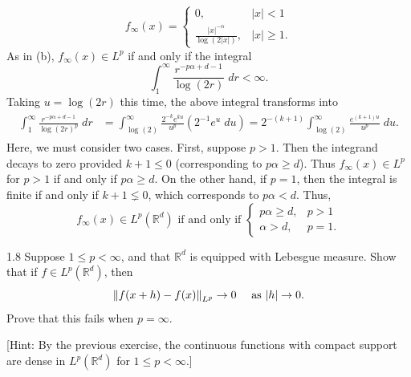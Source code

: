 \documentclass{article}
\begin{document}
\begin{enumerate}[itemsep =-2pt,label = (\alph{*})]
	\begin{equation*}
		f_{\infty}(x) = 
		\begin{cases}
			0, & |x| < 1 \\
			\displaystyle\frac{|x|^{-\alpha}}{\log(2|x|)}, & |x| \geq 1. 
		\end{cases}
	\end{equation*}
	As in (b), $f_{\infty}(x) \in L^{p}$ if and only if the integral 
	\begin{equation*}
		\int_{1}^{\infty}\frac{r^{-p\alpha + d - 1}}{\log(2r)}\;dr < \infty. 
	\end{equation*}
	Taking $u = \log(2r)$ this time, the above integral transforms into 
	\begin{align*}
		\begin{split}
			\int_{1}^{\infty}\frac{r^{-p\alpha + d - 1}}{\log(2r)^{p}}\;dr &= \int_{\log(2)}^{\infty}\frac{2^{-k}e^{ku}}{u^{p}}(2^{-1}e^{u}\;du) = 2^{-(k + 1)}\int_{\log(2)}^{\infty}\frac{e^{(k + 1)u}}{u^{p}}\;du. 
		\end{split}
	\end{align*}
	Here, we must consider two cases. First, suppose $p > 1$. Then the integrand decays to zero provided $k + 1 \leq 0$ (corresponding to $p\alpha \geq d$). Thus $f_{\infty}(x) \in L^{p}$ for $p > 1$ if and only if $p\alpha \geq d$. On the other hand, if $p = 1$, then the integral is finite if and only if $k + 1 \lneq 0$, which corresponds to $p\alpha < d$. Thus, 
	\begin{equation*}
		f_{\infty}(x) \in L^{p}(\mathbb{R}^{d}) \text{ if and only if }
		\begin{cases}
			p\alpha \geq d, & p > 1 \\
			\alpha > d, & p = 1.
		\end{cases}
	\end{equation*}
\end{enumerate}

\begin{prb}{1.8}
	Suppose $1 \leq p < \infty$, and that $\mathbb{R}^{d}$ is equipped with Lebesgue measure. Show that if $f \in L^{p}(\mathbb{R}^{d})$, then 
	\begin{equation*}
		\left\Vert f(x + h) - f(x) \right\Vert_{L^{p}} \to 0 \quad \text{ as $|h| \to 0$}. 
	\end{equation*}
	Prove that this fails when $p = \infty$. 
	
	[Hint: By the previous exercise, the continuous functions with compact support are dense in $L^{p}(\mathbb{R}^{d})$ for $1 \leq p < \infty$.]
\end{prb}
\end{document}
